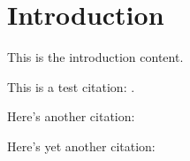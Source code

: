 \chapter{Introduction}
\label{ch:intro}

This is the introduction content.

This is a test citation: \cite{Lauro:2011jn}.

Here's another citation: \cite{Anonymous:2007ez}

Here's yet another citation: \cite{B:2006dj}
